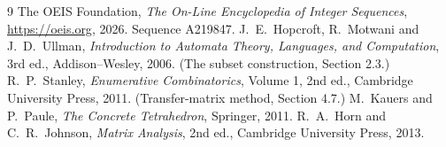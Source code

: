 \documentclass[11pt,a4paper]{article}
\theoremstyle{plain}
\theoremstyle{definition}
\begin{document}
\begin{thebibliography}{9}
 The OEIS Foundation, \emph{The On-Line Encyclopedia of Integer
Sequences}, \url{https://oeis.org}, 2026. Sequence A219847.
 J.~E.~Hopcroft, R.~Motwani and J.~D.~Ullman, \emph{Introduction to Automata
Theory, Languages, and Computation}, 3rd ed., Addison--Wesley, 2006. (The subset
construction, Section 2.3.)
 R.~P.~Stanley, \emph{Enumerative Combinatorics}, Volume 1, 2nd ed.,
Cambridge University Press, 2011. (Transfer-matrix method, Section 4.7.)
 M.~Kauers and P.~Paule, \emph{The Concrete Tetrahedron}, Springer, 2011.
 R.~A.~Horn and C.~R.~Johnson, \emph{Matrix Analysis}, 2nd ed., Cambridge
University Press, 2013.
\end{thebibliography}
\end{document}
